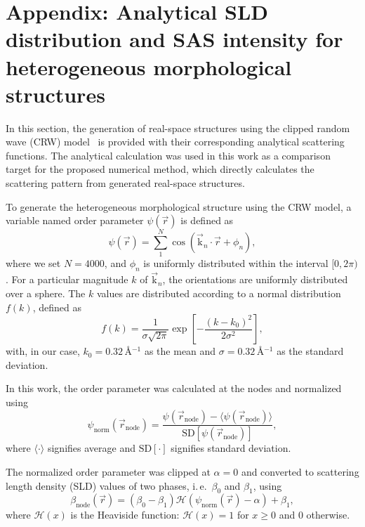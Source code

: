 \documentclass[preprint, 5p, times, twocolumn]{elsarticle}
\begin{document}
\section{Appendix: Analytical SLD distribution and SAS intensity for heterogeneous morphological structures}
\label{appxA}

In this section, the generation of real-space structures using the clipped random wave (CRW) model~\cite{berk1991scattering, chen1997measurement, choy2000clipped, hedstrom2004pore} is provided with their corresponding analytical scattering functions. The analytical calculation was used in this work as a comparison target for the proposed numerical method, which directly calculates the scattering pattern from generated real-space structures.

To generate the heterogeneous morphological structure using the CRW model, a variable named order parameter $\psi(\vec{r})$ is defined as
%
\begin{equation}
    \label{eqn:psi_r}
    \psi(\vec{r})=\sum_1^N \cos(\vec{\mathrm{k}}_n\cdot\vec{r} + \phi_n),
\end{equation}
%
where we set $N=4000$, and $\phi_n$ is uniformly distributed within the interval $[0, 2\pi)$. For a particular magnitude $k$ of $\vec{\mathrm{k}}_n$, the orientations are uniformly distributed over a sphere. The $k$ values are distributed according to a normal distribution $f(k)$, defined as 
%
\begin{equation}
    \label{eqn:f_k}
    f(k)=\frac{1}{\sigma\sqrt{2\pi}}\exp\left[-\frac{(k-k_0)^2}{2\sigma^2}\right],
\end{equation}
%
with, in our case, $k_0=0.32$\,\AA$^{-1}$ as the mean and $\sigma=0.32$\,\AA$^{-1}$ as the standard deviation.

In this work, the order parameter was calculated at the nodes and normalized using 
%
\begin{equation}
    \label{eqn:psi_norm}
    \psi_\text{norm}(\vec{r}_\text{node})=\frac{\psi(\vec{r}_\text{node})-\langle\psi(\vec{r}_\text{node})\rangle}{\text{SD}[\psi(\vec{r}_\text{node})]},
\end{equation}
%
where $\langle\cdot\rangle$ signifies average and $\text{SD}[\cdot]$ signifies standard deviation.

The normalized order parameter was clipped at $\alpha=0$ and converted to scattering length density (SLD) values of two phases, i.\,e.\ $\beta_0$ and $\beta_1$, using 
%
\begin{equation}
    \label{eqn:beta_crw}
    \beta_{\text{node}}(\vec{r})=(\beta_0-\beta_1) \mathcal{H}(\psi_{\text{norm}}(\vec{r})-\alpha) + \beta_1,
\end{equation}
%
where $\mathcal{H}(x)$ is the Heaviside function: $\mathcal{H}(x)=1$ for $x \geq 0$ and $0$ otherwise.
\end{document}
